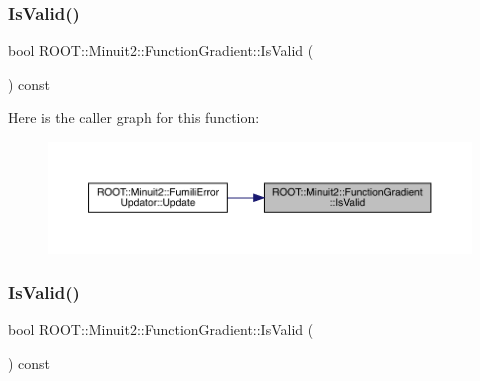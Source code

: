 \subsubsection{\texorpdfstring{IsValid()}{IsValid()}\hspace{0.1cm}{\footnotesize\ttfamily [1/2]}}
{\footnotesize\ttfamily bool R\+O\+O\+T\+::\+Minuit2\+::\+Function\+Gradient\+::\+Is\+Valid (\begin{DoxyParamCaption}{ }\end{DoxyParamCaption}) const\hspace{0.3cm}{\ttfamily [inline]}}

Here is the caller graph for this function\+:\nopagebreak
\begin{figure}[H]
\begin{center}
\leavevmode
\includegraphics[width=350pt]{d3/d48/classROOT_1_1Minuit2_1_1FunctionGradient_a441801769f9021ade74b724584731791_icgraph}
\end{center}
\end{figure}
\mbox{\label{classROOT_1_1Minuit2_1_1FunctionGradient_a441801769f9021ade74b724584731791}} 
\subsubsection{\texorpdfstring{IsValid()}{IsValid()}\hspace{0.1cm}{\footnotesize\ttfamily [2/2]}}
{\footnotesize\ttfamily bool R\+O\+O\+T\+::\+Minuit2\+::\+Function\+Gradient\+::\+Is\+Valid (\begin{DoxyParamCaption}{ }\end{DoxyParamCaption}) const\hspace{0.3cm}{\ttfamily [inline]}}

\mbox{\label{classROOT_1_1Minuit2_1_1FunctionGradient_a0b85ff1f65dbefea4c3953898efb06ec}} 
